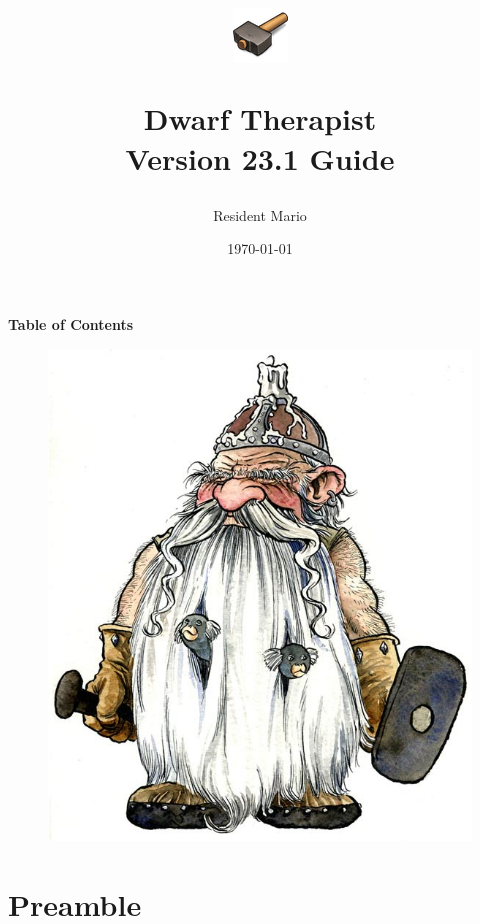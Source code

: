 \documentclass[]{article}
\begin{document}

\title{ \begin{figure}[h!] \centering \includegraphics[scale=.8]{logo}
\end{figure}
\textbf{Dwarf Therapist}\\Version 23.1 Guide}
\author{Resident Mario}
\date{\today}
\maketitle

\newpage
{}
\begin{center}
\textbf{Table of Contents}
\end{center}
\tableofcontents
\vfill
\begin{figure}[h!]
\centering
\includegraphics[scale=.5]{Illustration2}
\end{figure}
\vfill
\newpage

\part{Preamble}
\end{document}
